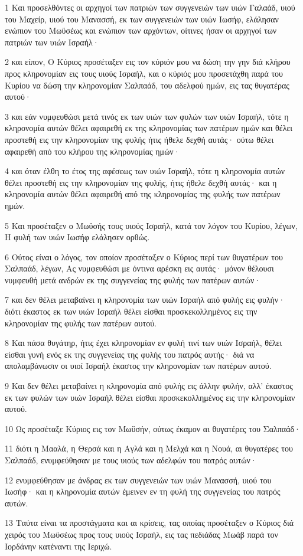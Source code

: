 \par 1 Και προσελθόντες οι αρχηγοί των πατριών των συγγενειών των υιών Γαλαάδ, υιού του Μαχείρ, υιού του Μανασσή, εκ των συγγενειών των υιών Ιωσήφ, ελάλησαν ενώπιον του Μωϋσέως και ενώπιον των αρχόντων, οίτινες ήσαν οι αρχηγοί των πατριών των υιών Ισραήλ·
\par 2 και είπον, Ο Κύριος προσέταξεν εις τον κύριόν μου να δώση την γην διά κλήρου προς κληρονομίαν εις τους υιούς Ισραήλ, και ο κύριός μου προσετάχθη παρά του Κυρίου να δώση την κληρονομίαν Σαλπαάδ, του αδελφού ημών, εις τας θυγατέρας αυτού·
\par 3 και εάν νυμφευθώσι μετά τινός εκ των υιών των φυλών των υιών Ισραήλ, τότε η κληρονομία αυτών θέλει αφαιρεθή εκ της κληρονομίας των πατέρων ημών και θέλει προστεθή εις την κληρονομίαν της φυλής ήτις ήθελε δεχθή αυτάς· ούτω θέλει αφαιρεθή από του κλήρου της κληρονομίας ημών·
\par 4 και όταν έλθη το έτος της αφέσεως των υιών Ισραήλ, τότε η κληρονομία αυτών θέλει προστεθή εις την κληρονομίαν της φυλής, ήτις ήθελε δεχθή αυτάς· και η κληρονομία αυτών θέλει αφαιρεθή από της κληρονομίας της φυλής των πατέρων ημών.
\par 5 Και προσέταξεν ο Μωϋσής τους υιούς Ισραήλ, κατά τον λόγον του Κυρίου, λέγων, Η φυλή των υιών Ιωσήφ ελάλησεν ορθώς.
\par 6 Ούτος είναι ο λόγος, τον οποίον προσέταξεν ο Κύριος περί των θυγατέρων του Σαλπαάδ, λέγων, Ας νυμφευθώσι με όντινα αρέσκη εις αυτάς· μόνον θέλουσι νυμφευθή μετά ανδρών εκ της συγγενείας της φυλής των πατέρων αυτών·
\par 7 και δεν θέλει μεταβαίνει η κληρονομία των υιών Ισραήλ από φυλής εις φυλήν· διότι έκαστος εκ των υιών Ισραήλ θέλει είσθαι προσκεκολλημένος εις την κληρονομίαν της φυλής των πατέρων αυτού.
\par 8 Και πάσα θυγάτηρ, ήτις έχει κληρονομίαν εν φυλή τινί των υιών Ισραήλ, θέλει είσθαι γυνή ενός εκ της συγγενείας της φυλής του πατρός αυτής· διά να απολαμβάνωσιν οι υιοί Ισραήλ έκαστος την κληρονομίαν των πατέρων αυτού.
\par 9 Και δεν θέλει μεταβαίνει η κληρονομία από φυλής εις άλλην φυλήν, αλλ' έκαστος εκ των φυλών των υιών Ισραήλ θέλει είσθαι προσκεκολλημένος εις την κληρονομίαν αυτού.
\par 10 Ως προσέταξε Κύριος εις τον Μωϋσήν, ούτως έκαμον αι θυγατέρες του Σαλπαάδ·
\par 11 διότι η Μααλά, η Θερσά και η Αγλά και η Μελχά και η Νουά, αι θυγατέρες του Σαλπαάδ, ενυμφεύθησαν με τους υιούς των αδελφών του πατρός αυτών·
\par 12 ενυμφεύθησαν με άνδρας εκ των συγγενειών των υιών Μανασσή, υιού του Ιωσήφ· και η κληρονομία αυτών έμεινεν εν τη φυλή της συγγενείας του πατρός αυτών.
\par 13 Ταύτα είναι τα προστάγματα και αι κρίσεις, τας οποίας προσέταξεν ο Κύριος διά χειρός του Μωϋσέως προς τους υιούς Ισραήλ, εις τας πεδιάδας Μωάβ παρά τον Ιορδάνην κατέναντι της Ιεριχώ.



